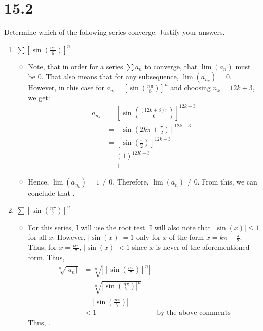 \documentclass[10pt,a4paper]{article}
\theoremstyle{definition}
\begin{document}
\section*{15.2}
Determine which of the following series converge. Justify your answers.
\begin{enumerate}[label = (\alph*)]
\item $\displaystyle \sum \left[\sin\left(\frac{n\pi}{6}\right)\right]^n$
	\begin{itemize}
	\item Note, that in order for a series $\sum a_n$ to converge, that $\lim(a_n)$ must be 0. That also means that for any subsequence, $\lim(a_{n_k}) = 0$. However, in this case for $\displaystyle a_n =  \left[\sin\left(\frac{n\pi}{6}\right)\right]^n$ and choosing $n_k = 12k + 3$, we get:
	\begin{align*}
	a_{n_k} &= \left[\sin\left(\frac{(12k + 3)\pi}{6}\right)\right]^{12k + 3}\\
	&= \left[\sin\left(2k\pi + \frac{\pi}{2}\right)\right]^{12k + 3}\\
	&= \left[\sin\left(\frac{\pi}{2}\right)\right]^{12k + 3}\\
	&= (1)^{12K + 3}\\
	&= 1
	\end{align*}
	\item Hence, $\lim(a_{n_k}) = 1 \neq 0$. Therefore, $\lim(a_n) \neq 0$. From this, we can conclude that .
	\end{itemize}
\item $\displaystyle \sum \left[\sin\left(\frac{n\pi}{7}\right)\right]^n$
	\begin{itemize}
	\item For this series, I will use the root test. I will also note that $|\sin(x)| \leq 1$ for all $x$. However, $|\sin(x)| = 1$ only for $x$ of the form $x = k\pi + \frac{\pi}{2}$. Thus, for $x = \frac{n\pi}{7}$, $|\sin(x)| < 1$ since $x$ is never of the aforementioned form. Thus, 
	\begin{align*}
	\sqrt[n]{|a_n|} &= \sqrt[n]{\left|\left[\sin\left(\frac{n\pi}{7}\right)\right]^n \right|}\\
	&= \sqrt[n]{\left|\sin\left(\frac{n\pi}{7}\right)\right|^n}\\
	&= \left|\sin\left(\frac{n\pi}{7}\right)\right|\\
	&< 1 &\text{by the above comments}
	\end{align*}
	Thus, .
	\end{itemize}
\end{enumerate}
\end{document}
